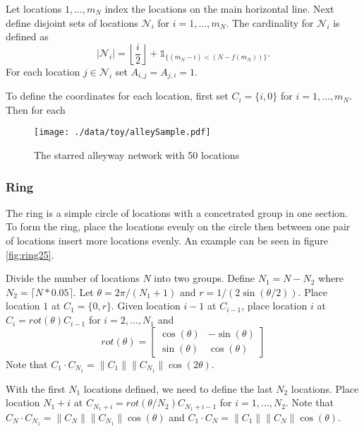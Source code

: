 \documentclass[11pt]{article}
\begin{document}
Let locations $1,\ldots,m_N$ index the locations on the main
horizontal line.  Next define disjoint sets of locations
$\mathcal{N}_i$ for $i = 1,\ldots,m_N$.  The cardinality for
$\mathcal{N}_i$ is defined as
\begin{equation*}
  | \mathcal{N}_i | = \left\lfloor \frac{i}{2} \right\rfloor +
  \mathds{1}_{\lbrace(m_N - i) < (N - f(m_N))\rbrace}.
\end{equation*}
For each location $j \in \mathcal{N}_i$ set $A_{i,j} = A_{j,i} = 1$.

To define the coordinates for each location, first set $C_{i} =
\lbrace i,0 \rbrace$ for $i = 1,\ldots,m_N$.  Then for each 


\begin{figure}[htb]
\centering
\texttt{[image: ./data/toy/alleySample.pdf]}
\caption{\label{fig:alley25}The starred alleyway network with 50 locations}
\end{figure}



\subsubsection{Ring}
\label{sec-2-1-3}

The ring is a simple circle of locations with a concetrated group in one
section.  To form the ring, place the locations evenly on the circle
then between one pair of locations insert more locations evenly.  An
example can be seen in figure \ref{fig:ring25}.

Divide the number of locations $N$ into two groups.  Define $N_1 = N -
N_2$ where $N_2 = \lceil N*0.05 \rceil$.  Let $\theta = 2\pi/(N_1+1)$
and $r = 1/(2\sin(\theta/2))$.  Place location $1$ at $C_1 = \lbrace
0,r \rbrace$.  Given location $i-1$ at $C_{i-1}$, place location $i$
at $C_i = rot(\theta) C_{i-1}$ for $i = 2,\ldots,N_1$ and
\begin{equation*}
  rot(\theta) = \left[
    \begin{matrix}
      \cos(\theta) & -\sin(\theta)\\
      \sin(\theta) & \cos(\theta)
    \end{matrix}
  \right]
\end{equation*}
Note that $C_{1} \cdot C_{N_1} = \|C_{1}\| \|C_{N_1}\| \cos(2\theta)$.

With the first $N_1$ locations defined, we need to define the last
$N_2$ locations.  Place location $N_1 + i$ at $C_{N_1 + i} =
rot(\theta/N_2)C_{N_1 + i - 1}$ for $i = 1,\ldots,N_2$.  Note that
$C_{N} \cdot C_{N_1} = \|C_{N}\| \|C_{N_1}\| \cos(\theta)$ and $C_{1}
\cdot C_{N} = \|C_{1}\| \|C_{N}\| \cos(\theta)$.
\end{document}
